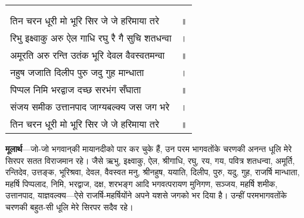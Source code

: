{
{\bfseries
\setlength{\mylenone}{0pt}
\settowidth{\mylentwo}{}
\setlength{\mylenone}{\maxof{\mylenone}{\mylentwo}}
\settowidth{\mylentwo}{तिन चरन धूरी मो भूरि सिर जे जे हरिमाया तरे}
\setlength{\mylenone}{\maxof{\mylenone}{\mylentwo}}
\settowidth{\mylentwo}{रिभु इक्ष्वाकु अरु ऐल गाधि रघु रै गै सुचि शतधन्वा}
\setlength{\mylenone}{\maxof{\mylenone}{\mylentwo}}
\settowidth{\mylentwo}{अमूरति अरु रन्ति उतंक भूरि देवल वैवस्वतमन्वा}
\setlength{\mylenone}{\maxof{\mylenone}{\mylentwo}}
\settowidth{\mylentwo}{नहुष जजाति दिलीप पुरु जदु गुह मान्धाता}
\setlength{\mylenone}{\maxof{\mylenone}{\mylentwo}}
\settowidth{\mylentwo}{पिप्पल निमि भरद्वाज दच्छ सरभंग सँघाता}
\setlength{\mylenone}{\maxof{\mylenone}{\mylentwo}}
\settowidth{\mylentwo}{संजय समीक उत्तानपाद जाग्यबल्क्य जस जग भरे}
\setlength{\mylenone}{\maxof{\mylenone}{\mylentwo}}
\settowidth{\mylentwo}{तिन चरन धूरी मो भूरि सिर जे जे हरिमाया तरे}
\setlength{\mylenone}{\maxof{\mylenone}{\mylentwo}}
\setlength{\mylentwo}{\baselineskip}
\setlength{\mylenone}{\mylenone + 1pt}
\begin{longtable}[l]{@{\hspace*{\mylen}}>{\setlength\parfillskip{0pt}}p{\mylenone}@{}@{}l@{}}
 & \\[-\the\mylentwo]
\centering{॥ १२ \hspace*{-1.5mm}॥} & \\ \nopagebreak
तिन चरन धूरी मो भूरि सिर जे जे हरिमाया तरे & ॥\\
रिभु इक्ष्वाकु अरु ऐल गाधि रघु रै गै सुचि शतधन्वा & ।\\ \nopagebreak
अमूरति अरु रन्ति उतंक भूरि देवल वैवस्वतमन्वा & ॥\\
नहुष जजाति दिलीप पुरु जदु गुह मान्धाता & ।\\ \nopagebreak
पिप्पल निमि भरद्वाज दच्छ सरभंग सँघाता & ॥\\
संजय समीक उत्तानपाद जाग्यबल्क्य जस जग भरे & ।\\ \nopagebreak
तिन चरन धूरी मो भूरि सिर जे जे हरिमाया तरे & ॥
\end{longtable}
}
}
\begin{sloppypar}\justifying{}
\textbf{मूलार्थ}—जो-जो भगवान्‌की मायानदीको पार कर चुके हैं, उन परम भागवतोंके चरणकी अनन्त धूलि मेरे सिरपर सतत विराजमान रहे। जैसे ऋभु, इक्ष्वाकु, ऐल, श्रीगाधि, रघु, रय, गय, पवित्र शतधन्वा, अमूर्ति, रन्तिदेव, उत्तङ्क, भूरिश्रवा, देवल, वैवस्वत मनु, श्रीनहुष, ययाति, दिलीप, पुरु, यदु, गुह, राजर्षि मान्धाता, महर्षि पिप्पलाद, निमि, भरद्वाज, दक्ष, शरभङ्ग आदि भगवत्परायण मुनिगण, सञ्जय, महर्षि शमीक, उत्तानपाद, याज्ञवल्क्य—ऐसे राजर्षि-महर्षियोंने अपने यशसे जगको भर दिया है। उन्हीं परमभागवतोंके चरणकी बहुत-सी धूलि मेरे सिरपर सदैव रहे।
\end{sloppypar}
